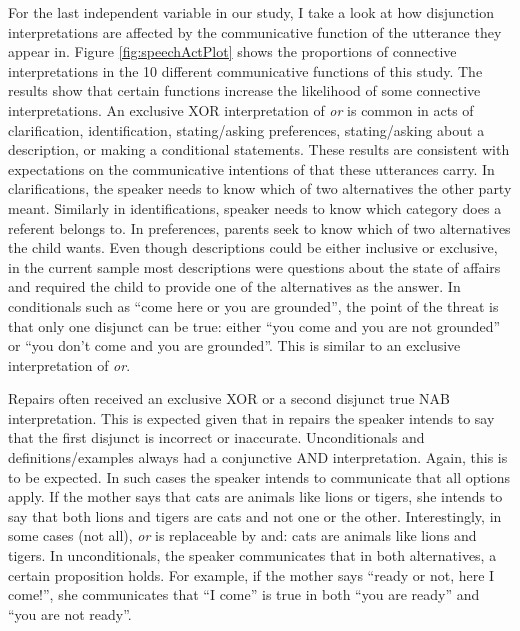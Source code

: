 \documentclass[oneside]{report}
\theoremstyle{definition}
\theoremstyle{definition}
\theoremstyle{definition}
\theoremstyle{remark}
\begin{document}
For the last independent variable in our study, I take a look at how
disjunction interpretations are affected by the communicative function
of the utterance they appear in. Figure \ref{fig:speechActPlot} shows
the proportions of connective interpretations in the 10 different
communicative functions of this study. The results show that certain
functions increase the likelihood of some connective interpretations. An
exclusive XOR interpretation of \emph{or} is common in acts of
clarification, identification, stating/asking preferences,
stating/asking about a description, or making a conditional statements.
These results are consistent with expectations on the communicative
intentions of that these utterances carry. In clarifications, the
speaker needs to know which of two alternatives the other party meant.
Similarly in identifications, speaker needs to know which category does
a referent belongs to. In preferences, parents seek to know which of two
alternatives the child wants. Even though descriptions could be either
inclusive or exclusive, in the current sample most descriptions were
questions about the state of affairs and required the child to provide
one of the alternatives as the answer. In conditionals such as ``come
here or you are grounded'', the point of the threat is that only one
disjunct can be true: either ``you come and you are not grounded'' or
``you don't come and you are grounded''. This is similar to an exclusive
interpretation of \emph{or}.

Repairs often received an exclusive XOR or a second disjunct true NAB
interpretation. This is expected given that in repairs the speaker
intends to say that the first disjunct is incorrect or inaccurate.
Unconditionals and definitions/examples always had a conjunctive AND
interpretation. Again, this is to be expected. In such cases the speaker
intends to communicate that all options apply. If the mother says that
cats are animals like lions or tigers, she intends to say that both
lions and tigers are cats and not one or the other. Interestingly, in
some cases (not all), \emph{or} is replaceable by and: cats are animals
like lions and tigers. In unconditionals, the speaker communicates that
in both alternatives, a certain proposition holds. For example, if the
mother says ``ready or not, here I come!'', she communicates that ``I
come'' is true in both ``you are ready'' and ``you are not ready''.
\end{document}
